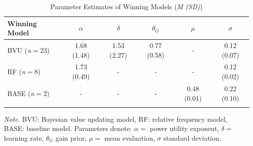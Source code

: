 \documentclass[a4paper, man, floatsintext]{apa6}
\begin{document}
\begin{table}[tbp]
\begin{center}
\begin{threeparttable}
\caption{\label{tab:model_par}Parameter Estimates of Winning Models (\textit{M (SD)})}
\begin{tabular}{lccccc}
\toprule
Winning Model & $\alpha$ & $\delta$ & $\theta_G$ & $\mu$ & $\sigma$\\
\midrule
BVU (\textit{n}$=$23) & 1.68 (1.48) & 1.53 (2.27) & 0.77 (0.58) & - & 0.12 (0.07)\\
RF (\textit{n}$=$8) & 1.73 (0.49) & - & - & - & 0.12 (0.02)\\
BASE (\textit{n}$=$2) & - & - & - & 0.48 (0.01) & 0.22 (0.10)\\
\bottomrule
\addlinespace
\end{tabular}
\begin{tablenotes}[para]
\normalsize{\textit{Note.} BVU: Bayesian value updating model, RF: relative frequency model, BASE: baseline model. Parameters denote: $\alpha=$ power utility exponent, $\delta=$ learning rate, $\theta_G$ gain prior, $\mu=$ mean evaluation, $\sigma$ standard deviation.}
\end{tablenotes}
\end{threeparttable}
\end{center}
\end{table}
\end{document}
